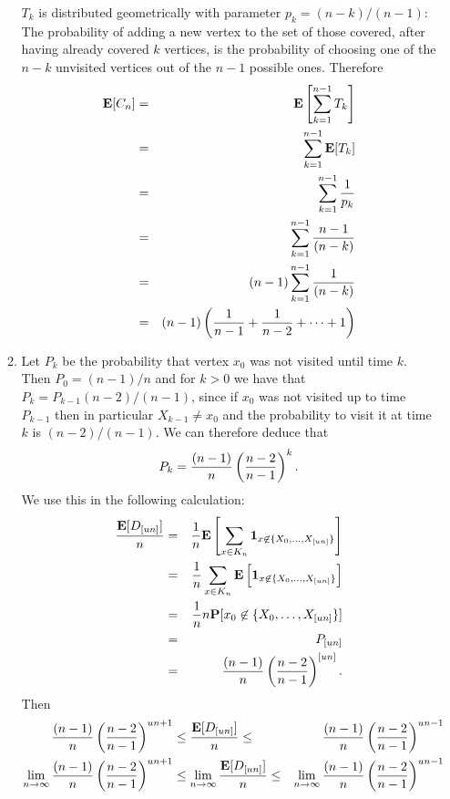 \documentclass[11pt]{article} \usepackage{amssymb}
\newcommand{\E}{{\bf E}} \newcommand{\Cov}{{\bf Cov}}
\begin{document}
\begin{enumerate}
\begin{enumerate}
      $T_k$ is distributed geometrically with parameter 
      $p_k=(n-k)/(n-1)$: The
      probability of adding a new vertex to the set of those covered, after 
      having already covered $k$ vertices, is the probability of choosing
      one of the $n-k$ unvisited vertices out of the $n-1$ possible ones. 
      Therefore
      \begin{eqnarray*}
        \E[C_n]&=&\E\left[\sum_{k=1}^{n-1}T_k\right]
        \\ &=&\sum_{k=1}^{n-1}\E[T_k]
        \\ &=&\sum_{k=1}^{n-1}{1\over p_k}
        \\ &=&\sum_{k=1}^{n-1}{n-1\over (n-k)}
        \\ &=&(n-1)\sum_{k=1}^{n-1}{1\over (n-k)}
        \\ &=& (n-1)\left({1\over n-1}+{1\over n-2}+\cdots+1\right)
      \end{eqnarray*}
    \item
      Let $P_k$ be the probability that vertex $x_0$ was not visited until
      time $k$. Then $P_0=(n-1)/n$ and for $k>0$ we have that 
      $P_k=P_{k-1}(n-2)/(n-1)$, since if $x_0$ was not visited up to time 
      $P_{k-1}$ then in particular $X_{k-1}\neq x_0$ and the probability to visit
      it at time $k$ is $(n-2)/(n-1)$. We can therefore deduce that
      $$P_k={(n-1)\over n}\left({n-2\over n-1}\right)^k.$$
      We use this in the  following calculation:
      \begin{eqnarray*}
        {\E[D_{[un]}]\over n} &=& {1\over n}\E\left[\sum_{x\in K_n}{\bf 1}_{x \not \in \{X_0,\ldots,X_{[un]}\}}\right]
        \\ &=& {1\over n}\sum_{x\in K_n}\E\left[{\bf 1}_{x \not \in \{X_0,\ldots,X_{[un]}\}}\right]
        \\ &=& {1\over n}n\P[x_0 \not \in \{X_0,\ldots,X_{[un]}\}]
        \\ &=& P_{[un]}
        \\ &=& {(n-1)\over n}\left({n-2\over n-1}\right)^{[un]}.
        \end{eqnarray*}
        Then
        \begin{eqnarray*}
          {(n-1)\over n}\left({n-2\over n-1}\right)^{un+1} &\leq {\E[D_{[un]}]\over n} \leq& {(n-1)\over n}\left({n-2\over n-1}\right)^{un-1}
          \\ \lim_{n \to \infty}{(n-1)\over n}\left({n-2\over n-1}\right)^{un+1} &\leq \lim_{n \to \infty}{\E[D_{[un]}]\over n} \leq& \lim_{n \to \infty}{(n-1)\over n}\left({n-2\over n-1}\right)^{un-1}

\end{eqnarray*}
\end{enumerate}
\end{enumerate}
\end{document}
